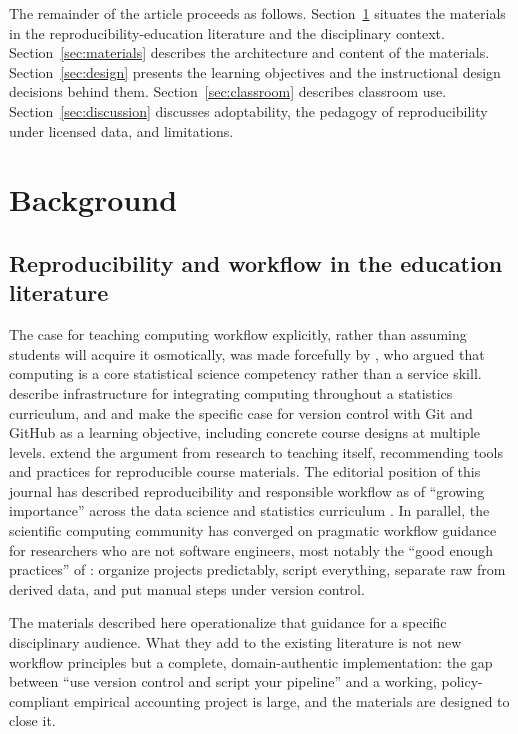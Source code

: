 \documentclass[12pt]{article}
\begin{document}
The remainder of the article proceeds as follows. Section~\ref{sec:bg}
situates the materials in the reproducibility-education literature and
the disciplinary context. Section~\ref{sec:materials} describes the
architecture and content of the materials. Section~\ref{sec:design}
presents the learning objectives and the instructional design decisions
behind them. Section~\ref{sec:classroom} describes classroom use.
Section~\ref{sec:discussion} discusses adoptability, the pedagogy of
reproducibility under licensed data, and limitations.

\section{Background}
\label{sec:bg}

\subsection{Reproducibility and workflow in the education literature}

The case for teaching computing workflow explicitly, rather than assuming
students will acquire it osmotically, was made forcefully by
\citet{nolan2010computing}, who argued that computing is a core
statistical science competency rather than a service skill.
\citet{cetinkayarundel2018infrastructure} describe infrastructure for
integrating computing throughout a statistics curriculum, and
\citet{bryan2018version} and \citet{beckman2021git} make the specific
case for version control with Git and GitHub as a learning objective,
including concrete course designs at multiple levels.
\citet{dogucu2022reproducible} extend the argument from research to
teaching itself, recommending tools and practices for reproducible course
materials. The editorial position of this journal has described
reproducibility and responsible workflow as of ``growing importance''
across the data science and statistics curriculum
\citep{horton2022growing}. In parallel, the scientific computing
community has converged on pragmatic workflow guidance for researchers
who are not software engineers, most notably the ``good enough
practices'' of \citet{wilson2017good}: organize projects predictably,
script everything, separate raw from derived data, and put manual steps
under version control.

The materials described here operationalize that guidance for a specific
disciplinary audience. What they add to the existing literature is not
new workflow principles but a complete, domain-authentic implementation:
the gap between ``use version control and script your pipeline'' and a
working, policy-compliant empirical accounting project is large, and the
materials are designed to close it.
\end{document}
